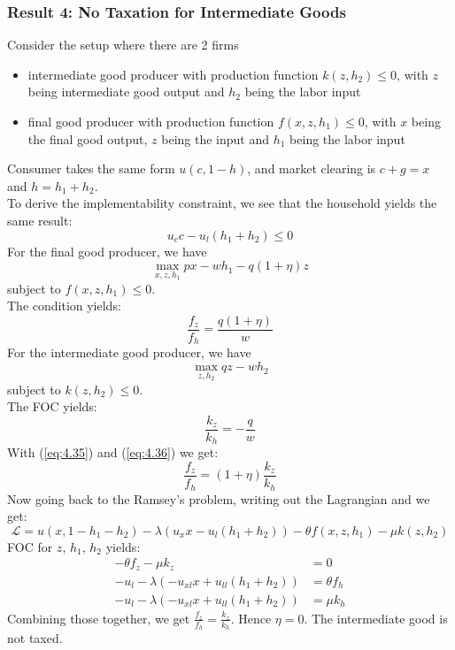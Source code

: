 \documentclass[12pt]{article}
\begin{document}
	\subsubsection*{Result 4: No Taxation for Intermediate Goods}
	Consider the setup where there are 2 firms
	\begin{itemize}
		\item intermediate good producer with production function $k(z, h_2)\leq 0$, with $z$ being intermediate good output and $h_2$ being the labor input
		\item final good producer with production function $f(x, z, h_1)\leq 0$, with $x$ being the final good output, $z$ being the input and $h_1$ being the labor input
	\end{itemize}
	Consumer takes the same form $u(c, 1-h)$, and market clearing is $c+g = x$ and $h = h_1 + h_2$.\\
	To derive the implementability constraint, we see that the household yields the same result:
	\begin{equation*}
		u_c c - u_l (h_1 + h_2) \leq 0
	\end{equation*}
	For the final good producer, we have
	\begin{equation*}
		\max_{x, z, h_1} px - wh_1 - q(1+\eta)z
	\end{equation*}
	subject to $f(x, z, h_1) \leq 0$.\\
	The condition yields:
	\begin{equation} \label{eq:4.35}
		\frac{f_z}{f_h} = \frac{q(1+\eta)}{w}
	\end{equation}
	For the intermediate good producer, we have
	\begin{equation*}
		\max_{z, h_2} qz - wh_2
	\end{equation*}
	subject to $k(z, h_2) \leq 0$.\\
	The FOC yields:
	\begin{equation} \label{eq:4.36}
		\frac{k_z}{k_h} = -\frac{q}{w}
	\end{equation}
	With (\ref{eq:4.35}) and (\ref{eq:4.36}) we get:
	\begin{equation}
		\frac{f_z}{f_h} = (1+\eta)\frac{k_z}{k_h}
	\end{equation}
	Now going back to the Ramsey's problem, writing out the Lagrangian and we get:
	\begin{equation*}
		\mathcal{L}=u(x, 1-h_1 -h_2) - \lambda(u_x x - u_l(h_1 + h_2)) - \theta f(x, z, h_1) - \mu k(z, h_2)
	\end{equation*}
	FOC for $z$, $h_1$, $h_2$ yields:
	\begin{align*}
		-\theta f_z - \mu k_z &= 0\\
		-u_l - \lambda(-u_{xl}x + u_{ll}(h_1 + h_2)) &= \theta f_h\\
		-u_l - \lambda(-u_{xl}x + u_{ll}(h_1 + h_2)) &= \mu k_h
	\end{align*}
	Combining those together, we get $\frac{f_z}{f_h} =\frac{k_z}{k_h}$. Hence $\eta = 0$. The intermediate good is not taxed.
	
\end{document}
